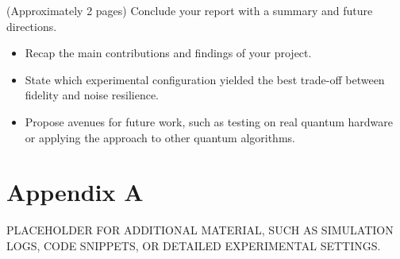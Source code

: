\documentclass[11pt,a4paper]{article}
\begin{document}
(Approximately 2 pages) Conclude your report with a summary and future directions.

\begin{itemize}
    \item Recap the main contributions and findings of your project.
    \item State which experimental configuration yielded the best trade-off between fidelity and noise resilience.
    \item Propose avenues for future work, such as testing on real quantum hardware or applying the approach to other quantum algorithms.
\end{itemize}

%
%
\printbibliography

%
%
\newpage
\appendix
\section*{Appendix A}

PLACEHOLDER FOR ADDITIONAL MATERIAL, SUCH AS SIMULATION LOGS, CODE SNIPPETS, OR DETAILED EXPERIMENTAL SETTINGS.
\end{document}
